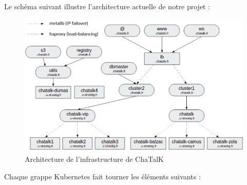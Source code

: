 Le schéma suivant illustre l'architecture actuelle de notre projet :

\begin{figure}
  \caption{\label{infra-arch} Architecture de l'infrastructure de ChaTalK}
  \includegraphics[width=15cm]{images/infra-arch}
\end{figure}

Chaque grappe Kubernetes fait tourner les éléments suivants :

